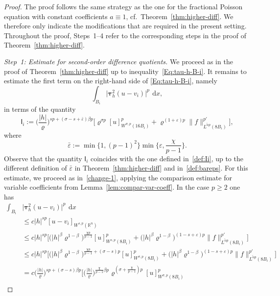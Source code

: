 \documentclass[10pt,letterpaper]{amsart}
\theoremstyle{definition}
\numberwithin{theorem}{section}
\numberwithin{equation}{section}
\newcommand{\1}{\ensuremath{\mathds{1}}}
\newcommand\sfI{{\boldsymbol{\mathsf I}}}
\renewcommand{\epsilon}{\varepsilon}
\renewcommand{\rho}{\varrho}
\renewcommand{\epsilon}{\varepsilon}
\renewcommand{\rho}{\varrho}
\renewcommand{\d}{\:\! \mathrm{d}}
\numberwithin{equation}{section}
\begin{document}
\begin{proof}
The proof follows the same strategy as the one for the fractional Poisson equation
with constant coefficients $a\equiv1$, cf.\ Theorem~\ref{thm:higher-diff}.
We therefore only indicate the modifications that are required in the present setting.
Throughout the proof, Steps~1--4 refer to the corresponding steps in the proof of
Theorem~\ref{thm:higher-diff}.


\smallskip
\noindent
\textit{Step~1: Estimate for second-order difference quotients.}
We proceed as in the proof of Theorem~\ref{thm:higher-diff} up to
inequality~\eqref{Eq:tau-h-B-i}. 
It remains to estimate the first term on the right-hand side of
\eqref{Eq:tau-h-B-i}, namely
\[
     \int_{B_i} \big|\boldsymbol\tau_h^2 (u - v_i)\big|^p \,\d x,
\]
in terms of the quantity
\[
    \sfI_i
    :=
    \Big(\frac{|h|}{\rho}\Big)^{sp+(\sigma-s+\bar\epsilon)\beta p} 
    \Big[
        \rho^{\sigma p} [u]_{W^{\sigma,p}(16B_i)}^p
        +
        \rho^{(1+\epsilon)p}
        \|f\|_{L^{\tilde\alpha p}(8B_i)}^{p'}
    \Big],
\]
where
\begin{equation}\label{def:bareps}
    \bar\epsilon
    :=
    \min\{1,(p-1)^2\}
    \min\bigg\{\epsilon,\frac{\chi}{p-1}\bigg\}.
\end{equation}
Observe that the quantity $\sfI_i$ coincides with the one defined
in~\eqref{def:Ii}, up to the different definition of $\bar\epsilon$
in Theorem~\ref{thm:higher-diff} and in~\eqref{def:bareps}.
For this estimate, we proceed as in~\eqref{change-1}, applying
the comparison estimate for variable coefficients from
Lemma~\ref{lem:compar-var-coeff}.
In the case $p\ge2$ one has
\begin{align*}
    \int_{B_i} &
    \big|\boldsymbol\tau_h^2 (u - v_i)\big|^p \,\d x\\
    &\le
    c |h|^{sp} [u-v_i]_{W^{s,p}(\mathbb{R}^n)} \\
    &\le
    c |h|^{sp} \Big[
    \big(|h|^\beta\rho^{1-\beta}\big)^{\frac{\chi p}{p-1}}[u]^p_{W^{s,p}(8B_i)} 
    +
    \big(|h|^\beta\rho^{1-\beta}\big)^{(1-s+\epsilon)p}
    \|f\|_{L^{\tilde\alpha p}(8B_i)}^{p'} \Big] \\
    &\le
    c |h|^{sp} \Big[
    \big(|h|^\beta\rho^{1-\beta}\big)^{\frac{\chi p}{p-1}+(\sigma-s)p}[u]^p_{W^{\sigma,p}(8B_i)}  +
    \big(|h|^\beta\rho^{1-\beta}\big)^{(1-s+\epsilon)p}
    \|f\|_{L^{\tilde\alpha p}(8B_i)}^{p'} \Big] \\
    &=
    c \Big(\frac{|h|}{\rho}\Big)^{sp+(\sigma-s)\beta p} 
    \bigg[ 
    \Big(\frac{|h|}{\rho}\Big)^{\frac{\chi}{p-1}\beta p} \rho^{(\sigma+\frac{\chi}{p-1})p} [u]^p_{W^{\sigma,p}(8B_i)} \\

\end{align*}
\end{proof}
\end{document}
